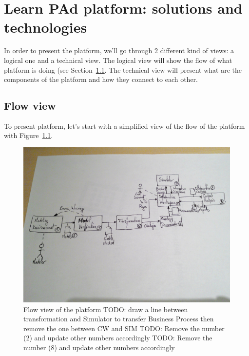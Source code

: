 \documentclass{learnpad}
\begin{document}
\chapter{Learn PAd platform: solutions and technologies}
\label{ch:platform}
In order to present the platform, we'll go through 2 different kind of views: a
logical one and a technical view.  The logical view will show the flow of what
\learnpad platform is doing (see Section~\ref{sec:flow-view}.  The technical
view will present what are the components of the \learnpad platform and how they
connect to each other.

\section{Flow view}
\label{sec:flow-view}
To present \learnpad platform, let's start with a simplified view of the flow of
the \learnpad platform with Figure~\ref{fig:flow-view}.

\begin{figure}[!htp]
	\centering
	\includegraphics[width=.6\paperwidth,keepaspectratio]{figures/learnpad-flow.jpg}
	\caption{Flow view of the \learnpad platform\newline
	TODO: draw a line between transformation and Simulator to transfer Business Process then remove the one between CW and SIM\newline
	TODO: Remove the number (2) and update other numbers accordingly\newline
	TODO: Remove the number (8) and update other numbers accordingly}
	\label{fig:flow-view}
\end{figure}
\end{document}
